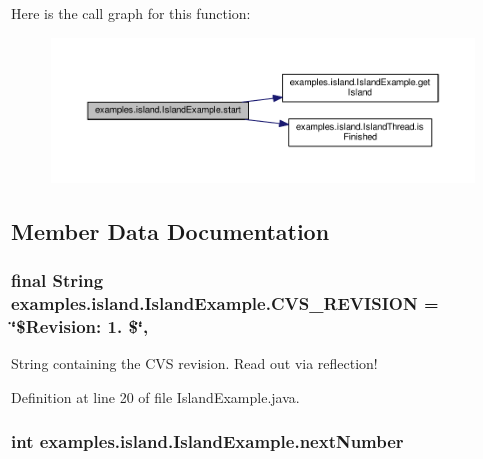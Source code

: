 Here is the call graph for this function\-:
\nopagebreak
\begin{figure}[H]
\begin{center}
\leavevmode
\includegraphics[width=350pt]{classexamples_1_1island_1_1_island_example_aad36c7af08e927224e83d83a04b104e1_cgraph}
\end{center}
\end{figure}




\subsection{Member Data Documentation}
\hypertarget{classexamples_1_1island_1_1_island_example_abb57e3b8645ed9cdf6c49a48e2389687}{
\subsubsection[{C\-V\-S\-\_\-\-R\-E\-V\-I\-S\-I\-O\-N}]{\setlength{\rightskip}{0pt plus 5cm}final String examples.\-island.\-Island\-Example.\-C\-V\-S\-\_\-\-R\-E\-V\-I\-S\-I\-O\-N = \char`\"{}\$Revision\-: 1. \$\char`\"{}\hspace{0.3cm}{\ttfamily [static]}, {\ttfamily [private]}}}\label{classexamples_1_1island_1_1_island_example_abb57e3b8645ed9cdf6c49a48e2389687}
String containing the C\-V\-S revision. Read out via reflection! 

Definition at line 20 of file Island\-Example.\-java.

\hypertarget{classexamples_1_1island_1_1_island_example_aad00699c42d3ffa5485898b13117e18c}{
\subsubsection[{next\-Number}]{\setlength{\rightskip}{0pt plus 5cm}int examples.\-island.\-Island\-Example.\-next\-Number\hspace{0.3cm}{\ttfamily [private]}}}\label{classexamples_1_1island_1_1_island_example_aad00699c42d3ffa5485898b13117e18c}


